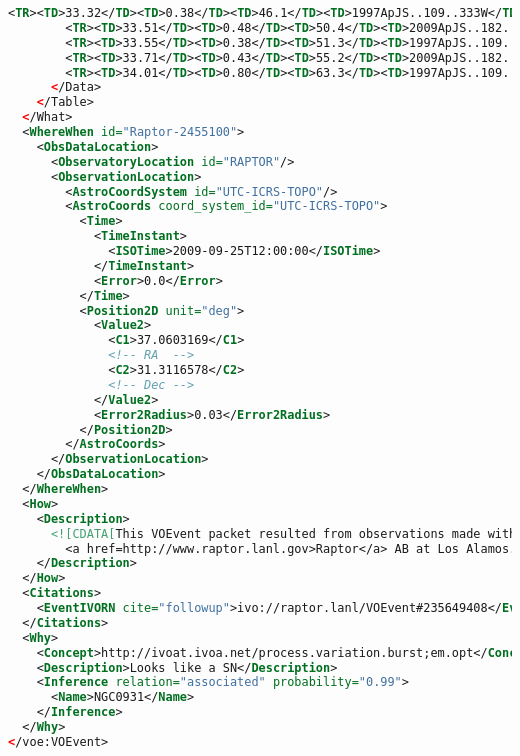\documentclass[11pt,a4paper]{ivoa}
\begin{document}
\begin{lstlisting}[language=XML]
        <TR><TD>33.32</TD><TD>0.38</TD><TD>46.1</TD><TD>1997ApJS..109..333W</TD></TR>
        <TR><TD>33.51</TD><TD>0.48</TD><TD>50.4</TD><TD>2009ApJS..182..474S</TD></TR>
        <TR><TD>33.55</TD><TD>0.38</TD><TD>51.3</TD><TD>1997ApJS..109..333W</TD></TR>
        <TR><TD>33.71</TD><TD>0.43</TD><TD>55.2</TD><TD>2009ApJS..182..474S</TD></TR>
        <TR><TD>34.01</TD><TD>0.80</TD><TD>63.3</TD><TD>1997ApJS..109..333W</TD></TR>
      </Data>
    </Table>
  </What>
  <WhereWhen id="Raptor-2455100">
    <ObsDataLocation>
      <ObservatoryLocation id="RAPTOR"/>
      <ObservationLocation>
        <AstroCoordSystem id="UTC-ICRS-TOPO"/>
        <AstroCoords coord_system_id="UTC-ICRS-TOPO">
          <Time>
            <TimeInstant>
              <ISOTime>2009-09-25T12:00:00</ISOTime>
            </TimeInstant>
            <Error>0.0</Error>
          </Time>
          <Position2D unit="deg">
            <Value2>
              <C1>37.0603169</C1>
              <!-- RA  -->
              <C2>31.3116578</C2>
              <!-- Dec -->
            </Value2>
            <Error2Radius>0.03</Error2Radius>
          </Position2D>
        </AstroCoords>
      </ObservationLocation>
    </ObsDataLocation>
  </WhereWhen>
  <How>
    <Description>
      <![CDATA[This VOEvent packet resulted from observations made with
        <a href=http://www.raptor.lanl.gov>Raptor</a> AB at Los Alamos. ]]>
    </Description>
  </How>
  <Citations>
    <EventIVORN cite="followup">ivo://raptor.lanl/VOEvent#235649408</EventIVORN>
  </Citations>
  <Why>
    <Concept>http://ivoat.ivoa.net/process.variation.burst;em.opt</Concept>
    <Description>Looks like a SN</Description>
    <Inference relation="associated" probability="0.99">
      <Name>NGC0931</Name>
    </Inference>
  </Why>
</voe:VOEvent>
\end{lstlisting}
\end{document}

